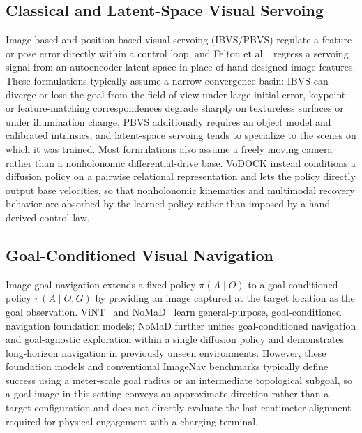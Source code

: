 \documentclass[letterpaper, 10 pt, conference]{IEEEtran}  %
\begin{document}
\subsection{Classical and Latent-Space Visual Servoing}
Image-based and position-based visual servoing (IBVS/PBVS) regulate a feature or pose error directly within a control loop, and Felton et al.~\cite{felton2022latentvs} regress a servoing signal from an autoencoder latent space in place of hand-designed image features. These formulations typically assume a narrow convergence basin: IBVS can diverge or lose the goal from the field of view under large initial error, keypoint- or feature-matching correspondences degrade sharply on textureless surfaces or under illumination change, PBVS additionally requires an object model and calibrated intrinsics, and latent-space servoing tends to specialize to the scenes on which it was trained. Most formulations also assume a freely moving camera rather than a nonholonomic differential-drive base. VoDOCK instead conditions a diffusion policy on a pairwise relational representation and lets the policy directly output base velocities, so that nonholonomic kinematics and multimodal recovery behavior are absorbed by the learned policy rather than imposed by a hand-derived control law.

\subsection{Goal-Conditioned Visual Navigation}
Image-goal navigation extends a fixed policy $\pi(A\mid O)$ to a goal-conditioned policy $\pi(A\mid O,G)$ by providing an image captured at the target location as the goal observation. ViNT~\cite{shah2023vint} and NoMaD~\cite{c1} learn general-purpose, goal-conditioned navigation foundation models; NoMaD further unifies goal-conditioned navigation and goal-agnostic exploration within a single diffusion policy and demonstrates long-horizon navigation in previously unseen environments. However, these foundation models and conventional ImageNav benchmarks typically define success using a meter-scale goal radius or an intermediate topological subgoal, so a goal image in this setting conveys an approximate direction rather than a target configuration and does not directly evaluate the last-centimeter alignment required for physical engagement with a charging terminal.
\end{document}
